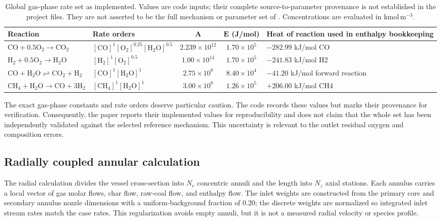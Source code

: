\documentclass[journal]{IEEEtran}
\newcommand{\CO}{\mathrm{CO}}
\newcommand{\COtwo}{\mathrm{CO_2}}
\newcommand{\Htwo}{\mathrm{H_2}}
\newcommand{\HtwoO}{\mathrm{H_2O}}
\newcommand{\Otwo}{\mathrm{O_2}}
\newcommand{\CHfour}{\mathrm{CH_4}}
\begin{document}
\begin{table}[t]
\caption{Global gas-phase rate set as implemented. Values are code inputs; their complete source-to-parameter provenance is not established in the project files. They are not asserted to be the full mechanism or parameter set of \cite{mularski2021}. Concentrations are evaluated in \(\mathrm{kmol\,m^{-3}}\).}
\label{tab:gas-kinetics}
\centering
\small
\begin{tabularx}{\textwidth}{>{\raggedright\arraybackslash}p{} >{\raggedright\arraybackslash}p{} c c X}
\toprule
\textbf{Reaction} & \textbf{Rate orders} & \(\boldsymbol{A}\) & \(\boldsymbol{E}\) (J/mol) & \textbf{Heat of reaction used in enthalpy bookkeeping} \\
\midrule
\(\CO+0.5\Otwo\rightarrow\COtwo\) & \([\CO]^1[\Otwo]^{0.25}[\HtwoO]^{0.5}\) & \(2.239\times10^{12}\) & \(1.70\times10^5\) & \(-282.99\) kJ/mol CO \\
\(\Htwo+0.5\Otwo\rightarrow\HtwoO\) & \([\Htwo]^1[\Otwo]^{0.5}\) & \(1.00\times10^{14}\) & \(1.70\times10^5\) & \(-241.83\) kJ/mol H2 \\
\(\CO+\HtwoO\rightleftharpoons\COtwo+\Htwo\) & \([\CO]^1[\HtwoO]^1\) & \(2.75\times10^9\) & \(8.40\times10^4\) & \(-41.20\) kJ/mol forward reaction \\
\(\CHfour+\HtwoO\rightarrow\CO+3\Htwo\) & \([\CHfour]^1[\HtwoO]^1\) & \(3.00\times10^8\) & \(1.26\times10^5\) & \(+206.00\) kJ/mol CH4 \\
\bottomrule
\end{tabularx}
\end{table}

The exact gas-phase constants and rate orders deserve particular caution. The code records these values but marks their provenance for verification. Consequently, the paper reports their implemented values for reproducibility and does not claim that the whole set has been independently validated against the selected reference mechanism. This uncertainty is relevant to the outlet residual oxygen and composition errors.

\subsection{Radially coupled annular calculation}
The radial calculation divides the vessel cross-section into \(N_r\) concentric annuli and the length into \(N_z\) axial stations. Each annulus carries a local vector of gas molar flows, char flow, raw-coal flow, and enthalpy flow. The inlet weights are constructed from the primary core and secondary annulus nozzle dimensions with a uniform-background fraction of 0.20; the discrete weights are normalized so integrated inlet stream rates match the case rates. This regularization avoids empty annuli, but it is not a measured radial velocity or species profile.
\end{document}
